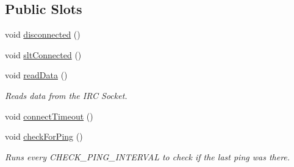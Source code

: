 \subsection*{Public Slots}
\begin{DoxyCompactItemize}
\item 
void \hyperlink{classserver_1_1irc_client_a32607649043e6053ff2ef9980df91800}{disconnected} ()
\item 
void \hyperlink{classserver_1_1irc_client_a31910635c17bd56be644084746653ba8}{slt\-Connected} ()
\item 
void \hyperlink{classserver_1_1irc_client_a384327d5a800bd0d970cffaf1a6a55c1}{read\-Data} ()
\begin{DoxyCompactList}\small\item\em Reads data from the I\-R\-C Socket. \end{DoxyCompactList}\item 
void \hyperlink{classserver_1_1irc_client_a9f9877406894f9b49bce12d8ad094bd7}{connect\-Timeout} ()
\item 
void \hyperlink{classserver_1_1irc_client_a6ea26ab5da3d338c84927312832f5b69}{check\-For\-Ping} ()
\begin{DoxyCompactList}\small\item\em Runs every C\-H\-E\-C\-K\-\_\-\-P\-I\-N\-G\-\_\-\-I\-N\-T\-E\-R\-V\-A\-L to check if the last ping was there. \end{DoxyCompactList}\end{DoxyCompactItemize}
